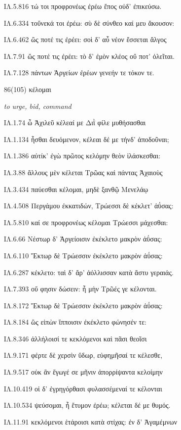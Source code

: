 \begin{enumerate}
{ΙΛ.5.816 τώ τοι προφρονέως ἐρέω ἔπος οὐδ' ἐπικεύσω. 

ΙΛ.6.334 τοὔνεκά τοι ἐρέω: σὺ δὲ σύνθεο καί μευ ἄκουσον: 

ΙΛ.6.462 ὥς ποτέ τις ἐρέει: σοὶ δ' αὖ νέον ἔσσεται ἄλγος 

ΙΛ.7.91 ὥς ποτέ τις ἐρέει: τὸ δ' ἐμὸν κλέος οὔ ποτ' ὀλεῖται. 

ΙΛ.7.128 πάντων Ἀργείων ἐρέων γενεήν τε τόκον τε. 

}

\clearpage
\item[\large 86(105)]{\large \g κέλομαι}

\hspace{0.2cm} \textit{ to urge, bid, command }

{\g
ΙΛ.1.74 ὦ Ἀχιλεῦ κέλεαί με Διῒ φίλε μυθήσασθαι 

ΙΛ.1.134 ἧσθαι δευόμενον, κέλεαι δέ με τήνδ' ἀποδοῦναι; 

ΙΛ.1.386 αὐτίκ' ἐγὼ πρῶτος κελόμην θεὸν ἱλάσκεσθαι: 

ΙΛ.3.88 ἄλλους μὲν κέλεται Τρῶας καὶ πάντας Ἀχαιοὺς 

ΙΛ.3.434 παύεσθαι κέλομαι, μηδὲ ξανθῷ Μενελάῳ 

ΙΛ.4.508 Περγάμου ἐκκατιδών, Τρώεσσι δὲ κέκλετ' ἀΰσας: 

ΙΛ.5.810 καί σε προφρονέως κέλομαι Τρώεσσι μάχεσθαι: 

ΙΛ.6.66 Νέστωρ δ' Ἀργείοισιν ἐκέκλετο μακρὸν ἀΰσας: 

ΙΛ.6.110 Ἕκτωρ δὲ Τρώεσσιν ἐκέκλετο μακρὸν ἀΰσας: 

ΙΛ.6.287 κέκλετο: ταὶ δ' ἄρ' ἀόλλισσαν κατὰ ἄστυ γεραιάς. 

ΙΛ.7.393 οὔ φησιν δώσειν: ἦ μὴν Τρῶές γε κέλονται. 

ΙΛ.8.172 Ἕκτωρ δὲ Τρώεσσιν ἐκέκλετο μακρὸν ἀΰσας: 

ΙΛ.8.184 ὣς εἰπὼν ἵπποισιν ἐκέκλετο φώνησέν τε: 

ΙΛ.8.346 ἀλλήλοισί τε κεκλόμενοι καὶ πᾶσι θεοῖσι 

ΙΛ.9.171 φέρτε δὲ χερσὶν ὕδωρ, εὐφημῆσαί τε κέλεσθε, 

ΙΛ.9.517 οὐκ ἂν ἔγωγέ σε μῆνιν ἀπορρίψαντα κελοίμην 

ΙΛ.10.419 οἱ δ' ἐγρηγόρθασι φυλασσέμεναί τε κέλονται 

ΙΛ.10.534 ψεύσομαι, ἦ ἔτυμον ἐρέω; κέλεται δέ με θυμός. 

ΙΛ.11.91 κεκλόμενοι ἑτάροισι κατὰ στίχας: ἐν δ' Ἀγαμέμνων 

}
\end{enumerate}
